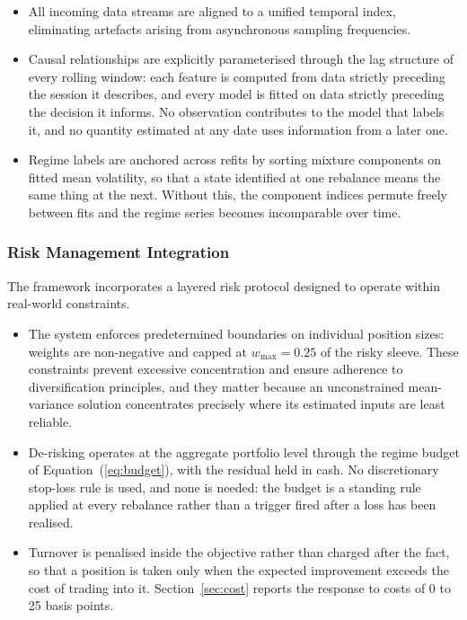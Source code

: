 \begin{itemize}
\item All incoming data streams are aligned to a unified temporal index, eliminating
artefacts arising from asynchronous sampling frequencies.
\item Causal relationships are explicitly parameterised through the lag structure of
every rolling window: each feature is computed from data strictly preceding the session
it describes, and every model is fitted on data strictly preceding the decision it
informs. No observation contributes to the model that labels it, and no quantity
estimated at any date uses information from a later one.
\item Regime labels are anchored across refits by sorting mixture components on fitted
mean volatility, so that a state identified at one rebalance means the same thing at the
next. Without this, the component indices permute freely between fits and the regime
series becomes incomparable over time.
\end{itemize}

\subsubsection{Risk Management Integration}

The framework incorporates a layered risk protocol designed to operate within real-world
constraints.

\begin{itemize}
\item The system enforces predetermined boundaries on individual position sizes: weights
are non-negative and capped at $w_{\max} = 0.25$ of the risky sleeve. These constraints
prevent excessive concentration and ensure adherence to diversification principles, and
they matter because an unconstrained mean-variance solution concentrates precisely where
its estimated inputs are least reliable.
\item De-risking operates at the aggregate portfolio level through the regime budget of
Equation~(\ref{eq:budget}), with the residual held in cash. No discretionary stop-loss
rule is used, and none is needed: the budget is a standing rule applied at every
rebalance rather than a trigger fired after a loss has been realised.
\item Turnover is penalised inside the objective rather than charged after the fact, so
that a position is taken only when the expected improvement exceeds the cost of trading
into it. Section~\ref{sec:cost} reports the response to costs of 0 to 25 basis points.
\end{itemize}

